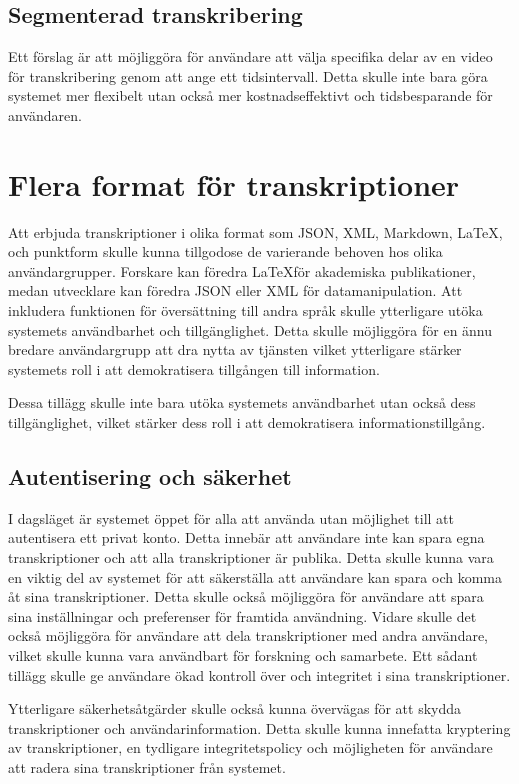 \subsection{Segmenterad transkribering}
Ett förslag är att möjliggöra för användare att
välja specifika delar av en video för transkribering genom att ange ett
tidsintervall. Detta skulle inte bara göra systemet mer flexibelt utan också
mer kostnadseffektivt och tidsbesparande för användaren.

\section{Flera format för transkriptioner}
Att erbjuda transkriptioner i olika format
som JSON, XML, Markdown, \LaTeX, och punktform skulle kunna tillgodose de
varierande behoven hos olika användargrupper. Forskare kan föredra \LaTeX för
akademiska publikationer, medan utvecklare kan föredra JSON eller XML för
datamanipulation. Att inkludera funktionen för översättning till andra språk skulle ytterligare utöka systemets användbarhet och tillgänglighet. Detta skulle möjliggöra för en ännu bredare användargrupp att dra nytta av tjänsten vilket ytterligare stärker systemets roll i att demokratisera tillgången till information.

Dessa tillägg skulle inte bara utöka systemets användbarhet utan också dess
tillgänglighet, vilket stärker dess roll i att demokratisera
informationstillgång.

\subsection{Autentisering och säkerhet}
I dagsläget är systemet öppet för alla att använda utan möjlighet till
att autentisera ett privat konto. Detta innebär att användare inte kan spara
egna transkriptioner och att alla transkriptioner är publika. Detta skulle
kunna vara en viktig del av systemet för att säkerställa att användare kan
spara och komma åt sina transkriptioner. Detta skulle också möjliggöra för
användare att spara sina inställningar och preferenser för framtida användning.
Vidare skulle det också möjliggöra för användare att dela transkriptioner med
andra användare, vilket skulle kunna vara användbart för forskning och
samarbete. Ett sådant tillägg skulle ge användare ökad kontroll över och
integritet i sina transkriptioner.

Ytterligare säkerhetsåtgärder skulle också kunna övervägas för att skydda
transkriptioner och användarinformation. Detta skulle kunna innefatta
kryptering av transkriptioner, en tydligare integritetspolicy och möjligheten
för användare att radera sina transkriptioner från systemet.

